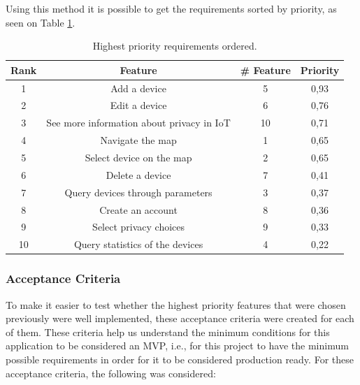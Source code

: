 Using this method it is possible to get the requirements sorted by priority,
as seen on Table \ref{table:sorted requirements}.

\begin{table}[H]
    \centering
    \begin{adjustbox}{width=0.8\textwidth,center=\textwidth}
        \begin{tabular}{|c|c|c|c|}
            \hline
            \rowcolor{gray!5}
            \textbf{Rank} & \textbf{Feature} & \textbf{\# Feature} & \textbf{Priority} \\
            \hline
            1 & Add a device & 5 & 0,93 \\
            \hline
            2 & Edit a device & 6 & 0,76 \\
            \hline
            3 & See more information about privacy in IoT & 10 & 0,71 \\
            \hline
            4 & Navigate the map & 1 & 0,65 \\
            \hline
            5 & Select device on the map & 2 & 0,65 \\
            \hline
            6 & Delete a device & 7 & 0,41 \\
            \hline
            7 & Query devices through parameters & 3 & 0,37 \\
            \hline
            8 & Create an account & 8 & 0,36 \\
            \hline
            9 & Select privacy choices & 9 & 0,33 \\
            \hline
            10 & Query statistics of the devices & 4 & 0,22 \\
            \hline
        \end{tabular}
    \end{adjustbox}
    \vspace{1em}
    \caption{Highest priority requirements ordered.}
    \label{table:sorted requirements}
\end{table}

\subsubsection{Acceptance Criteria}

To make it easier to test whether the highest priority features that were chosen
previously were well implemented, these acceptance criteria were created for each
of them. These criteria help us understand the minimum conditions for this
application to be considered an MVP, i.e., for this project to have the minimum
possible requirements in order for it to be considered production ready.
\newline
For these acceptance criteria, the following was considered:

